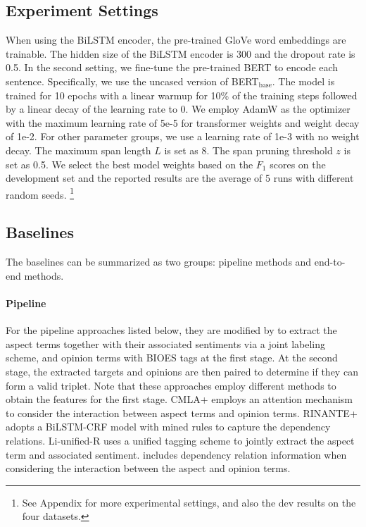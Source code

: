 \documentclass[11pt,a4paper]{article}
\begin{document}
\subsection{Experiment Settings}
When using the BiLSTM encoder, the pre-trained GloVe word embeddings are trainable.
The hidden size of the BiLSTM encoder is 300 and the dropout rate is 0.5.
In the second setting, we fine-tune the pre-trained BERT \cite{devlin2019bert} to encode each sentence.
Specifically, we use the 
{uncased version of BERT$_{\text{base}}$}.
The 
model is trained for 10 epochs with a linear warmup for 10\% of the training steps followed by a linear decay of the learning rate to 0.
We employ AdamW as the optimizer with the maximum learning rate of 5e-5 for transformer weights and weight decay of 1e-2. For other parameter groups, we use a learning rate of 1e-3 with no weight decay. 
The maximum span length $L$ is set as 8.
The span pruning threshold $z$ is set as 0.5.
We select the best model 
weights based on the $F_1$ scores on the development set and the reported results are the average of 5 runs with different random seeds.
\footnote{See Appendix for more experimental settings, and also the dev results on the four datasets.}

\subsection{Baselines}

The baselines can be summarized as two groups: pipeline methods and end-to-end methods.

\paragraph{Pipeline} 

For the pipeline approaches listed below, they are modified by \citet{peng2019knowing} to extract the aspect terms together with their associated sentiments via a joint labeling scheme, and opinion terms with BIOES tags at the first stage. At the second stage, the extracted targets and opinions are then paired to determine if they can form a valid triplet. Note that these approaches employ different methods to obtain the features for the first stage.
{CMLA+} \cite{wang2017coupled} employs an attention mechanism to consider the interaction between aspect terms and opinion terms.
{RINANTE+} \cite{dai2019neural} adopts a BiLSTM-CRF model with mined rules to capture the dependency relations.
{Li-unified-R} \cite{li2019unified} uses a unified tagging scheme to 
jointly extract the aspect term and associated sentiment.
\citet{peng2019knowing} includes dependency relation information when considering the interaction between the aspect and opinion terms. 
\end{document}
